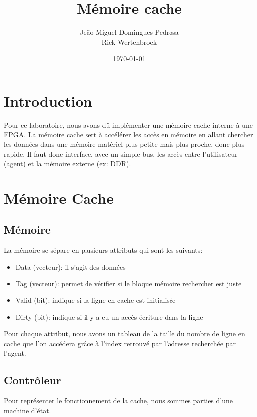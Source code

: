 \documentclass[10pt,a4paper]{article}
\author{João Miguel Domingues Pedrosa\\Rick Wertenbroek}
\title{Mémoire cache}
\date{\today}
\begin{document}
\maketitle
\newpage
\tableofcontents
\newpage

\section{Introduction}
Pour ce laboratoire, nous avons dû implémenter une mémoire cache interne à une FPGA. La mémoire cache sert à accélérer les accès en mémoire en allant chercher les données dans une mémoire matériel plus petite mais plus proche, donc plus rapide. Il faut donc interface, avec un simple bus, les accès entre l'utilisateur (agent) et la mémoire externe (ex: DDR).

\section{Mémoire Cache}
\subsection{Mémoire}
La mémoire se sépare en plusieurs attributs qui sont les suivants:\\

\begin{itemize}
	\item Data (vecteur): il s'agit des données
	\item Tag  (vecteur): permet de vérifier si le bloque mémoire rechercher est juste
	\item Valid (bit): indique si la ligne en cache est initialisée
	\item Dirty (bit): indique si il y a eu un accès écriture dans la ligne\\
\end{itemize}

Pour chaque attribut, nous avons un tableau de la taille du nombre de ligne en cache que l'on accédera grâce à l'index retrouvé par l'adresse recherchée par l'agent.

\newpage

\subsection{Contrôleur}
Pour représenter le fonctionnement de la cache, nous sommes parties d'une machine d'état.
\end{document}
